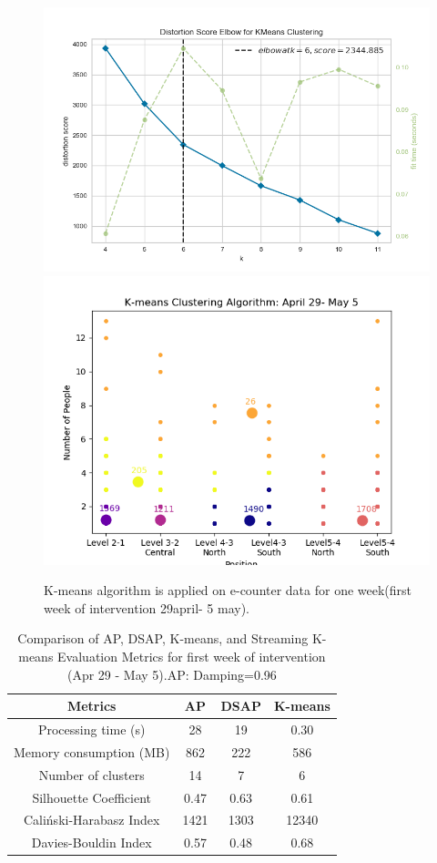 \documentclass[../UNBThesis2.tex]{subfiles}
\begin{document}
    
    
    
    
    
\begin{figure}[!h]
    \centering
    \includegraphics[width=.5\textwidth]{image/Chapters/Chapter6/elbow.png}%
    \includegraphics[width=.5\textwidth]{image/Chapters/Chapter6/kmeans1WeekDuring.png}%
    \caption{K-means algorithm is applied on e-counter data for one week(first week of intervention 29april- 5 may).}
    \label{elbkmean}
\end{figure}    


\begin{table}[!h]
    \centering
    \caption{Comparison of AP, DSAP, K-means, and Streaming K-means Evaluation Metrics for first week of intervention (Apr 29 - May 5).AP: Damping=0.96 }
    \label{all3}
    \begin{tabular}{|c|c|c|c|}
    \hline
      Metrics & AP & DSAP & K-means  \\
     \hline
      Processing time (s)         & 28       & 19 & 0.30      \\
     \hline
      Memory consumption (MB)     & 862      & 222 & 586 \\
     \hline
      Number of clusters          & 14       & 7 & 6   \\
      \hline
      Silhouette Coefficient      & 0.47     & 0.63 & 0.61\\
    \hline
    Caliński-Harabasz Index       & 1421     & 1303 & 12340      \\
    \hline
     Davies-Bouldin Index         & 0.57     &    0.48 & 0.68 \\
    \hline
    \end{tabular}
\end{table}
\end{document}

